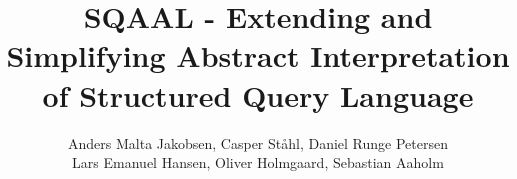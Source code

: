 
\title{SQAAL - Extending and Simplifying Abstract Interpretation of Structured Query Language}



\author{%
    Anders Malta Jakobsen,
    Casper Ståhl,
    Daniel Runge Petersen \\
    Lars Emanuel Hansen,
    Oliver Holmgaard,
    Sebastian Aaholm
}
